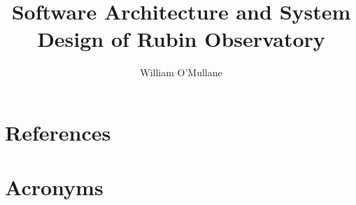 \documentclass[DM,authoryear,toc]{lsstdoc}
\title{Software Architecture and System Design of Rubin Observatory}
\author{%
William O'Mullane
}
\date{\vcsDate}
\begin{document}
\maketitle


\appendix
\section{References} \label{sec:bib}
\renewcommand{\refname}{} %


\section{Acronyms} \label{sec:acronyms}

\end{document}
